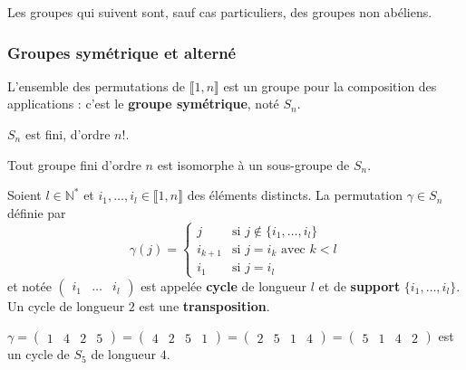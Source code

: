  Les groupes qui suivent sont, sauf cas particuliers, des groupes non abéliens.

  \subsubsection{Groupes symétrique et alterné}


  \begin{definition}
    L'ensemble des permutations de $\llbracket 1, n \rrbracket$ est un groupe pour la composition des applications : c'est le \textbf{groupe symétrique}, noté $S_n$.
  \end{definition}

  \begin{remark}
    $S_n$ est fini, d'ordre $n!$.
  \end{remark}

  \begin{theorem}[Cayley]
    Tout groupe fini d'ordre $n$ est isomorphe à un sous-groupe de $S_n$.
  \end{theorem}

  \begin{definition}
    Soient $l \in \mathbb{N}^*$ et $i_1, \dots, i_l \in \llbracket 1, n \rrbracket$ des éléments distincts. La permutation $\gamma \in S_n$ définie par
    \[
      \gamma(j) =
      \begin{cases}
        j &\text{si } j \notin \{ i_1, \dots, i_l \} \\
        i_{k+1} &\text{si } j = i_k \text{ avec } k<l \\
        i_1 &\text{si } j=i_l
      \end{cases}
    \]
    et notée $\begin{pmatrix} i_1 & \dots & i_l \end{pmatrix}$ est appelée \textbf{cycle} de longueur $l$ et de \textbf{support} $\{ i_1, \dots, i_l \}$. Un cycle de longueur $2$ est une \textbf{transposition}.
  \end{definition}

  \begin{example}
    $\gamma = \begin{pmatrix} 1 & 4 & 2 & 5 \end{pmatrix} = \begin{pmatrix} 4 & 2 & 5 & 1 \end{pmatrix} = \begin{pmatrix} 2 & 5 & 1 & 4 \end{pmatrix} = \begin{pmatrix} 5 & 1 & 4 & 2 \end{pmatrix}$ est un cycle de $S_5$ de longueur $4$.
  \end{example}

